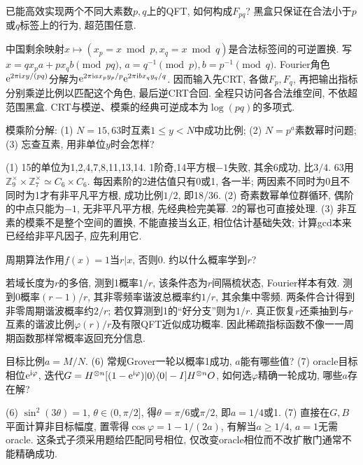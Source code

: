\begin{exercise}已能高效实现两个不同大素数$p,q$上的QFT, 如何构成$F_{pq}$? 黑盒只保证在合法小于$p$或$q$标签上的行为, 超范围任意.\end{exercise}
\begin{solution}中国剩余映射$x\mapsto(x_p=x\bmod p,x_q=x\bmod q)$是合法标签间的可逆置换. 写$x=qx_pa+px_qb\pmod{pq}$, $a=q^{-1}\pmod p,b=p^{-1}\pmod q$. Fourier角色$\mathrm e^{2\pi\mathrm i xy/(pq)}$分解为$\mathrm e^{2\pi\mathrm i ax_py_p/p}\mathrm e^{2\pi\mathrm i bx_qy_q/q}$. 因而输入先CRT, 各做$F_p,F_q$, 再把输出指标分别乘逆比例以匹配这个角色, 最后逆CRT合回. 全程只访问各合法维空间, 不依超范围黑盒. CRT与模逆、模乘的经典可逆成本为$\log(pq)$的多项式.
\end{solution}

\begin{exercise}模乘阶分解: (1) $N=15,63$时互素$1\le y<N$中成功比例; (2) $N=p^a$素数幂时问题; (3) 忘查互素, 用非单位$y$时会怎样?\end{exercise}
\begin{solution}(1) 15的单位为1,2,4,7,8,11,13,14. 1阶奇,14平方根$-1$失败, 其余6成功, 比$3/4$. 63用$\mathbb Z_9^\times\times\mathbb Z_7^\times\simeq C_6\times C_6$. 每因素阶的2进估值只有0或1, 各一半; 两因素不同时为0且不同时为1才有非平凡平方根, 成功比例$1/2$, 即18/36. (2) 奇素数幂单位群循环, 偶阶的中点只能为$-1$, 无非平凡平方根, 先经典检完美幂. 2的幂也可直接处理. (3) 非互素的模乘不是整个空间的置换, 不能直接当幺正, 相位估计基础失效; 计算gcd本来已经给非平凡因子, 应先利用它.
\end{solution}
\begin{exercise}周期算法作用$f(x)=1$当$r|x$, 否则0. 约以什么概率学到$r$?\end{exercise}
\begin{solution}若域长度为$r$的多倍, 测到1概率$1/r$, 该条件态为$r$间隔梳状态, Fourier样本有效. 测到0概率$(r-1)/r$, 其非零频率谐波总概率约$1/r$, 其余集中零频. 两条件合计得到非零周期谐波概率约$2/r$; 若仅算测到1的“好分支”则为$1/r$. 真正恢复$r$还乘抽到与$r$互素的谐波比例$\varphi(r)/r$及有限QFT近似成功概率. 因此稀疏指标函数不像一一周期函数那样常概率返回充分信息.
\end{solution}
\begin{exercise}目标比例$a=M/N$. (6) 常规Grover一轮以概率1成功, $a$能有哪些值? (7) oracle目标相位$\mathrm e^{\mathrm i\varphi}$, 迭代$G=H^{\otimes n}[(1-\mathrm e^{\mathrm i\varphi})\lvert 0\rangle\langle 0\rvert-I]H^{\otimes n}O$, 如何选$\varphi$精确一轮成功, 哪些$a$存在解?\end{exercise}
\begin{solution}(6) $\sin^2(3\theta)=1$, $\theta\in(0,\pi/2]$, 得$\theta=\pi/6$或$\pi/2$, 即$a=1/4$或1. (7) 直接在$G,B$平面计算非目标幅度, 置零得$\cos\varphi=1-1/(2a)$, 有解当$a\ge1/4$, $a=1$无需oracle. 这条式子须采用题给匹配同号相位, 仅改变oracle相位而不改扩散门通常不能精确成功.
\end{solution}

